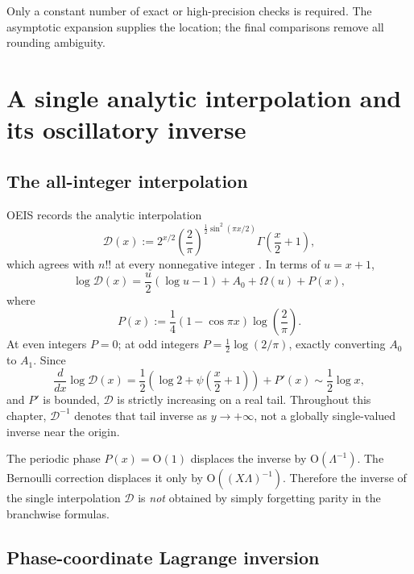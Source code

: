 \documentclass[11pt,a4paper,oneside]{book}
\newcommand{\Ord}{\mathrm O}
\begin{document}
Only a constant number of exact or high-precision checks is required.
The asymptotic expansion supplies the location; the final comparisons remove
all rounding ambiguity.

\chapter{A single analytic interpolation and its oscillatory inverse}
\label{ch:interpolation}

\section{The all-integer interpolation}

OEIS records the analytic interpolation
\begin{equation}\label{eq:Luschny}
 \mathscr D(x)
 :=
 2^{x/2}
 \left(\frac{2}{\pi}\right)^{
   \frac12\sin^2(\pi x/2)}
 \Gamma\!\left(\frac{x}{2}+1\right),
\end{equation}
which agrees with \(n!!\) at every nonnegative integer
\cite{OEIS-A006882}.  In terms of \(u=x+1\),
\begin{equation}\label{eq:interp-phase}
 \log\mathscr D(x)
 =
 \frac{u}{2}(\log u-1)+A_0+\Omega(u)+P(x),
\end{equation}
where
\begin{equation}\label{eq:P-periodic}
 P(x):=
 \frac14(1-\cos\pi x)\log\!\left(\frac{2}{\pi}\right).
\end{equation}
At even integers \(P=0\); at odd integers
\(P=\tfrac12\log(2/\pi)\), exactly converting \(A_0\) to \(A_1\).
Since
\[
 \frac{d}{dx}\log\mathscr D(x)
 =\frac12\!\left(\log2+\psi\!\left(\frac{x}{2}+1\right)\right)+P'(x)
 \sim\frac12\log x,
\]
and \(P'\) is bounded, \(\mathscr D\) is strictly increasing on a real tail.
Throughout this chapter, \(\mathscr D^{-1}\) denotes that tail inverse as
\(y\to+\infty\), not a globally single-valued inverse near the origin.

\begin{warningbox}
The periodic phase \(P(x)=\Ord(1)\) displaces the inverse by
\(\Ord(\Lambda^{-1})\).  The Bernoulli correction displaces it only by
\(\Ord((X\Lambda)^{-1})\).  Therefore the inverse of the single interpolation
\(\mathscr D\) is \emph{not} obtained by simply forgetting parity in the
branchwise formulas.
\end{warningbox}

\section{Phase-coordinate Lagrange inversion}
\end{document}
